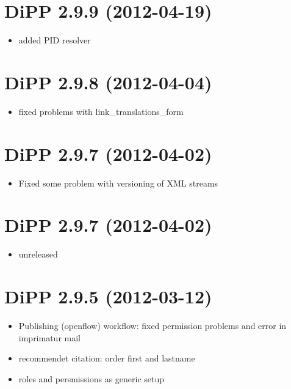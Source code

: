 \documentclass[a4paper,10pt,ngerman]{sphinxmanual}
\begin{document}
\section{DiPP 2.9.9 (2012-04-19)}
\label{changelog:dipp-2-9-9-2012-04-19}\begin{itemize}
\item {} 
added PID resolver

\end{itemize}


\section{DiPP 2.9.8 (2012-04-04)}
\label{changelog:dipp-2-9-8-2012-04-04}\begin{itemize}
\item {} 
fixed problems with link\_translations\_form

\end{itemize}


\section{DiPP 2.9.7 (2012-04-02)}
\label{changelog:dipp-2-9-7-2012-04-02}\begin{itemize}
\item {} 
Fixed some problem with versioning of XML streams

\end{itemize}


\section{DiPP 2.9.7 (2012-04-02)}
\label{changelog:id1}\begin{itemize}
\item {} 
unreleased

\end{itemize}


\section{DiPP 2.9.5 (2012-03-12)}
\label{changelog:dipp-2-9-5-2012-03-12}\begin{itemize}
\item {} 
Publishing (openflow) workflow: fixed permission problems and error
in imprimatur mail

\item {} 
recommendet citation: order first and lastname

\item {} 
roles and persmissions as generic setup

\end{itemize}
\end{document}
